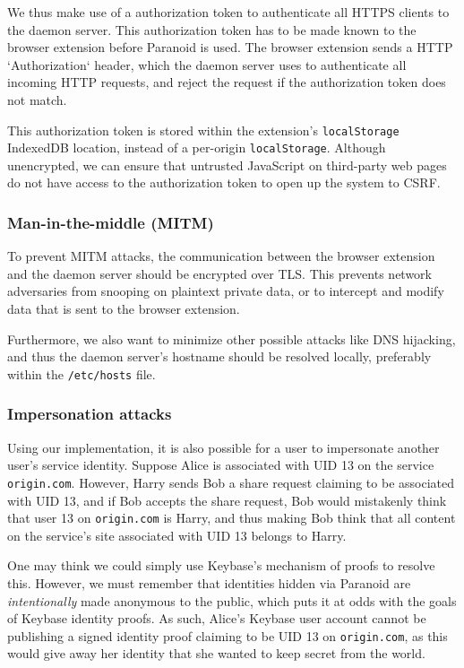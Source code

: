 \documentclass[letterpaper,twocolumn,10pt]{article}
\begin{document}
We thus make use of a authorization token to authenticate all HTTPS clients to the daemon server. This authorization token has to be made known to the browser extension before Paranoid is used. The browser extension sends a HTTP `Authorization` header, which the daemon server uses to authenticate all incoming HTTP requests, and reject the request if the authorization token does not match.

This authorization token is stored within the extension's \texttt{localStorage} IndexedDB location, instead of a per-origin \texttt{localStorage}. Although unencrypted, we can ensure that untrusted JavaScript on third-party web pages do not have access to the authorization token to open up the system to CSRF.

\subsubsection{Man-in-the-middle (MITM)}

To prevent MITM attacks, the communication between the browser extension and the daemon server should be encrypted over TLS. This prevents network adversaries from snooping on plaintext private data, or to intercept and modify data that is sent to the browser extension.

Furthermore, we also want to minimize other possible attacks like DNS hijacking, and thus the daemon server's hostname should be resolved locally, preferably within the \texttt{/etc/hosts} file.

\subsubsection{Impersonation attacks}

Using our implementation, it is also possible for a user to impersonate another user's service identity. Suppose Alice is associated with UID 13 on the service \texttt{origin.com}. However, Harry sends Bob a share request claiming to be associated with UID 13, and if Bob accepts the share request, Bob would mistakenly think that user 13 on \texttt{origin.com} is Harry, and thus making Bob think that all content on the service's site associated with UID 13 belongs to Harry.

One may think we could simply use Keybase's mechanism of proofs to resolve this. However, we must remember that identities hidden via Paranoid are \textit{intentionally} made anonymous to the public, which puts it at odds with the goals of Keybase identity proofs. As such, Alice's Keybase user account cannot be publishing a signed identity proof claiming to be UID 13 on \texttt{origin.com}, as this would give away her identity that she wanted to keep secret from the world.
\end{document}
